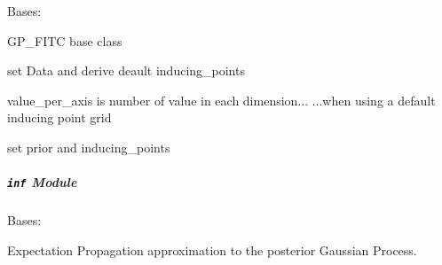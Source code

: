 \documentclass[letterpaper,10pt,english]{sphinxmanual}
\begin{document}
\begin{fulllineitems}
\label{pyGPs.Core:pyGPs.Core.gp.GP_FITC}
Bases: {\hyperref[pyGPs.Core:pyGPs.Core.gp.GP]{}}

GP\_FITC base class

\begin{fulllineitems}
\label{pyGPs.Core:pyGPs.Core.gp.GP_FITC.setData}
set Data and derive deault inducing\_points

value\_per\_axis is number of value in each dimension...
...when using a default inducing point grid

\end{fulllineitems}


\begin{fulllineitems}
\label{pyGPs.Core:pyGPs.Core.gp.GP_FITC.setPrior}
set prior and inducing\_points

\end{fulllineitems}


\end{fulllineitems}



\subparagraph{\texttt{inf} Module}
\label{pyGPs.Core:inf-module}\label{pyGPs.Core:module-pyGPs.Core.inf}

\begin{fulllineitems}
\label{pyGPs.Core:pyGPs.Core.inf.EP}
Bases: {\hyperref[Likelihoods:pyGPs.Core.inf.Inference]{}}

Expectation Propagation approximation to the posterior Gaussian Process.

\begin{fulllineitems}
\label{pyGPs.Core:pyGPs.Core.inf.EP.proceed}
\end{fulllineitems}


\end{fulllineitems}
\end{document}
